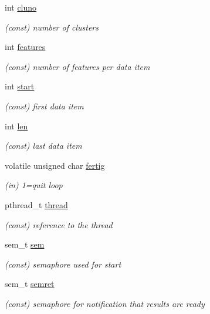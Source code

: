 \begin{DoxyCompactItemize}
int \mbox{\hyperlink{structkmeans__pt_a987049eea35a32b1d1ba469f37b4a862}{cluno}}
\begin{DoxyCompactList}\small\item\em (const) number of clusters \end{DoxyCompactList}\item 
int \mbox{\hyperlink{structkmeans__pt_a0b7e9c2f96d55642a579c66c916dfbac}{features}}
\begin{DoxyCompactList}\small\item\em (const) number of features per data item \end{DoxyCompactList}\item 
int \mbox{\hyperlink{structkmeans__pt_a7568dca47a635b63a775853ace1a231f}{start}}
\begin{DoxyCompactList}\small\item\em (const) first data item \end{DoxyCompactList}\item 
int \mbox{\hyperlink{structkmeans__pt_af49609aa1989feab464cfc85a25c3ec4}{len}}
\begin{DoxyCompactList}\small\item\em (const) last data item \end{DoxyCompactList}\item 
volatile unsigned char \mbox{\hyperlink{structkmeans__pt_ad2580bc7fb5eac708522af779db2d54c}{fertig}}
\begin{DoxyCompactList}\small\item\em (in) 1=quit loop \end{DoxyCompactList}\item 
pthread\+\_\+t \mbox{\hyperlink{structkmeans__pt_a2648d7c598e20fdf23e9d30f43b4b17c}{thread}}
\begin{DoxyCompactList}\small\item\em (const) reference to the thread \end{DoxyCompactList}\item 
sem\+\_\+t \mbox{\hyperlink{structkmeans__pt_af1c42a889c6180d899cb41066d2884c0}{sem}}
\begin{DoxyCompactList}\small\item\em (const) semaphore used for start \end{DoxyCompactList}\item 
sem\+\_\+t \mbox{\hyperlink{structkmeans__pt_aa959612fc7e6fa42798130bbf1c437a7}{semret}}
\begin{DoxyCompactList}\small\item\em (const) semaphore for notification that results are ready \end{DoxyCompactList}\end{DoxyCompactItemize}


